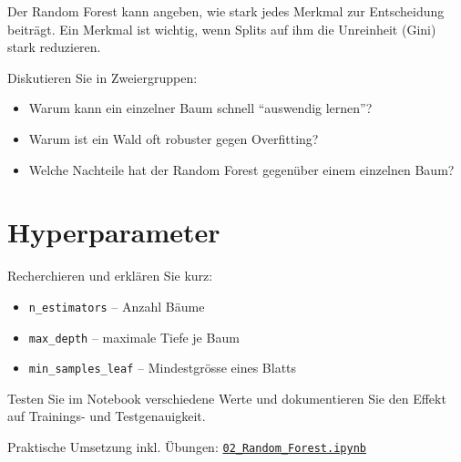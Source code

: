 \begin{mydefinition}
Der Random Forest kann angeben, wie stark jedes Merkmal zur Entscheidung beiträgt.
Ein Merkmal ist wichtig, wenn Splits auf ihm die Unreinheit (Gini) stark reduzieren.
\end{mydefinition}

\begin{myexercise}
Diskutieren Sie in Zweiergruppen:
\begin{itemize}
    \item Warum kann ein einzelner Baum schnell \enquote{auswendig lernen}?
    \item Warum ist ein Wald oft robuster gegen Overfitting?
    \item Welche Nachteile hat der Random Forest gegenüber einem einzelnen Baum?
\end{itemize}
\end{myexercise}

\section{Hyperparameter}

\begin{mychallenge}
Recherchieren und erklären Sie kurz:
\begin{itemize}
    \item \texttt{n\_estimators} -- Anzahl Bäume
    \item \texttt{max\_depth} -- maximale Tiefe je Baum
    \item \texttt{min\_samples\_leaf} -- Mindestgrösse eines Blatts
\end{itemize}
Testen Sie im Notebook verschiedene Werte und dokumentieren Sie den Effekt
auf Trainings- und Testgenauigkeit.
\end{mychallenge}

\begin{myremark}[Notebook]
Praktische Umsetzung inkl. Übungen:
\href{\notebookbaseurl02_Random_Forest_Classification.ipynb}{\texttt{02\_Random\_Forest.ipynb}}
\end{myremark}

